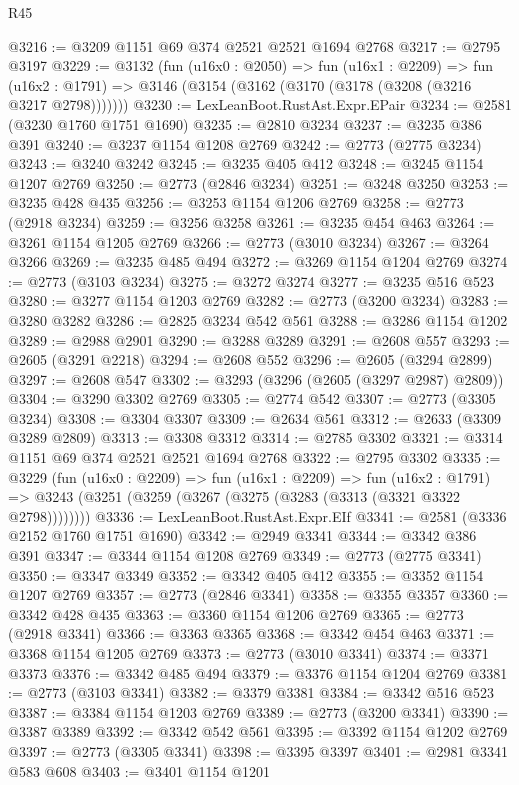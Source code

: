 \begin{lexlean}{R45}
\begin{coremodule}
@3216 := @3209 @1151 @69 @374 @2521 @2521 @1694 @2768
@3217 := @2795 @3197
@3229 := @3132
    (fun (u16x0 : @2050) =>
    fun (u16x1 : @2209) =>
    fun (u16x2 : @1791) => @3146 (@3154 (@3162 (@3170 (@3178 (@3208 (@3216 @3217 @2798)))))))
@3230 := LexLeanBoot.RustAst.Expr.EPair
@3234 := @2581 (@3230 @1760 @1751 @1690)
@3235 := @2810 @3234
@3237 := @3235 @386 @391
@3240 := @3237 @1154 @1208 @2769
@3242 := @2773 (@2775 @3234)
@3243 := @3240 @3242
@3245 := @3235 @405 @412
@3248 := @3245 @1154 @1207 @2769
@3250 := @2773 (@2846 @3234)
@3251 := @3248 @3250
@3253 := @3235 @428 @435
@3256 := @3253 @1154 @1206 @2769
@3258 := @2773 (@2918 @3234)
@3259 := @3256 @3258
@3261 := @3235 @454 @463
@3264 := @3261 @1154 @1205 @2769
@3266 := @2773 (@3010 @3234)
@3267 := @3264 @3266
@3269 := @3235 @485 @494
@3272 := @3269 @1154 @1204 @2769
@3274 := @2773 (@3103 @3234)
@3275 := @3272 @3274
@3277 := @3235 @516 @523
@3280 := @3277 @1154 @1203 @2769
@3282 := @2773 (@3200 @3234)
@3283 := @3280 @3282
@3286 := @2825 @3234 @542 @561
@3288 := @3286 @1154 @1202
@3289 := @2988 @2901
@3290 := @3288 @3289
@3291 := @2608 @557
@3293 := @2605 (@3291 @2218)
@3294 := @2608 @552
@3296 := @2605 (@3294 @2899)
@3297 := @2608 @547
@3302 := @3293 (@3296 (@2605 (@3297 @2987) @2809))
@3304 := @3290 @3302 @2769
@3305 := @2774 @542
@3307 := @2773 (@3305 @3234)
@3308 := @3304 @3307
@3309 := @2634 @561
@3312 := @2633 (@3309 @3289 @2809)
@3313 := @3308 @3312
@3314 := @2785 @3302
@3321 := @3314 @1151 @69 @374 @2521 @2521 @1694 @2768
@3322 := @2795 @3302
@3335 := @3229
    (fun (u16x0 : @2209) =>
    fun (u16x1 : @2209) =>
    fun (u16x2 : @1791) =>
    @3243 (@3251 (@3259 (@3267 (@3275 (@3283 (@3313 (@3321 @3322 @2798))))))))
@3336 := LexLeanBoot.RustAst.Expr.EIf
@3341 := @2581 (@3336 @2152 @1760 @1751 @1690)
@3342 := @2949 @3341
@3344 := @3342 @386 @391
@3347 := @3344 @1154 @1208 @2769
@3349 := @2773 (@2775 @3341)
@3350 := @3347 @3349
@3352 := @3342 @405 @412
@3355 := @3352 @1154 @1207 @2769
@3357 := @2773 (@2846 @3341)
@3358 := @3355 @3357
@3360 := @3342 @428 @435
@3363 := @3360 @1154 @1206 @2769
@3365 := @2773 (@2918 @3341)
@3366 := @3363 @3365
@3368 := @3342 @454 @463
@3371 := @3368 @1154 @1205 @2769
@3373 := @2773 (@3010 @3341)
@3374 := @3371 @3373
@3376 := @3342 @485 @494
@3379 := @3376 @1154 @1204 @2769
@3381 := @2773 (@3103 @3341)
@3382 := @3379 @3381
@3384 := @3342 @516 @523
@3387 := @3384 @1154 @1203 @2769
@3389 := @2773 (@3200 @3341)
@3390 := @3387 @3389
@3392 := @3342 @542 @561
@3395 := @3392 @1154 @1202 @2769
@3397 := @2773 (@3305 @3341)
@3398 := @3395 @3397
@3401 := @2981 @3341 @583 @608
@3403 := @3401 @1154 @1201

\end{coremodule}
\end{lexlean}
